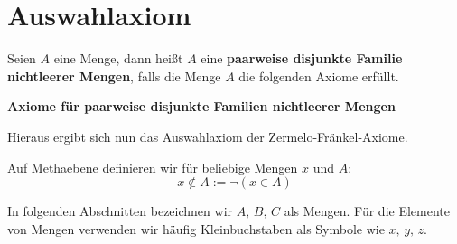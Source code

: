 \documentclass[main.tex]{subfiles}
\begin{document}
{
}
\begin{tabproof}
\end{tabproof}

\section{Auswahlaxiom}

\begin{definition}
Seien \(A\) eine Menge, dann heißt \(A\) eine \textbf{paarweise disjunkte Familie nichtleerer Mengen}, falls die Menge \(A\) die folgenden Axiome erfüllt.

\noindent\textbf{Axiome für paarweise disjunkte Familien nichtleerer Mengen}
\begin{AxTable}
\end{AxTable}
\end{definition}



Hieraus ergibt sich nun das Auswahlaxiom der Zermelo-Fränkel-Axiome.




Auf Methaebene definieren wir für beliebige Mengen \(x\) und \(A\): \[x\not\in A:=\neg(x\in A)\]

\begin{remark}
In folgenden Abschnitten bezeichnen wir \(A,\, B,\, C\) als Mengen. Für die Elemente von Mengen verwenden wir häufig Kleinbuchstaben als Symbole wie \(x,\, y,\, z\).
\end{remark}
\end{document}
